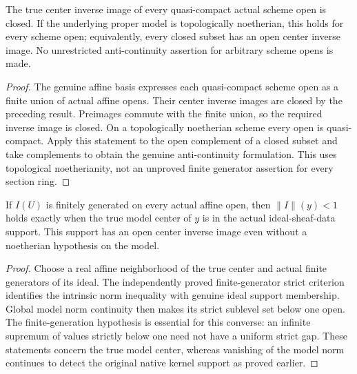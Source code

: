 \begin{theorem}
\label{scheme:proper-center-anticontinuity}
\leanok
{}
The true center inverse image of every quasi-compact actual scheme open
is closed. If the underlying proper model is topologically noetherian,
this holds for every scheme open; equivalently, every closed subset has
an open center inverse image. No unrestricted anti-continuity assertion
for arbitrary scheme opens is made.
\end{theorem}
\begin{proof}
The genuine affine basis expresses each quasi-compact scheme open as a
finite union of actual affine opens. Their center inverse images are
closed by the preceding result. Preimages commute with the finite union,
so the required inverse image is closed. On a topologically noetherian
scheme every open is quasi-compact. Apply this statement to the open
complement of a closed subset and take complements to obtain the genuine
anti-continuity formulation. This uses topological noetherianity, not an
unproved finite generator assertion for every section ring.
\end{proof}

\begin{theorem}
\label{scheme:fg-ideal-support-center-open}
\leanok
{}
If $I(U)$ is finitely generated on every actual affine open, then
$\|I\|(y)<1$ holds exactly when the true model center of $y$ is in the
actual ideal-sheaf-data support. This support has an open center inverse
image even without a noetherian hypothesis on the model.
\end{theorem}
\begin{proof}
Choose a real affine neighborhood of the true center and actual finite
generators of its ideal. The independently proved finite-generator strict
criterion identifies the intrinsic norm inequality with genuine ideal
support membership. Global model norm continuity then makes its strict
sublevel set below one open. The finite-generation hypothesis is essential
for this converse: an infinite supremum of values strictly below one need
not have a uniform strict gap. These statements concern the true model
center, whereas vanishing of the model norm continues to detect the
original native kernel support as proved earlier.
\end{proof}
